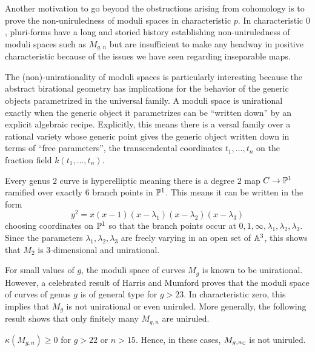\documentclass[main.tex]{subfiles}
\begin{document}
Another motivation to go beyond the obstructions arising from \etale cohomology is to prove the non-uniruledness of moduli spaces in characteristic $p$. In characteristic $0$, pluri-forms have a long and storied history establishing non-uniruledness of moduli spaces such as $M_{g,n}$ but are insufficient to make any headway in positive characteristic because of the issues we have seen regarding inseparable maps.
\par 
The (non)-unirationality of moduli spaces is particularly interesting because the abstract birational geometry has implications for the behavior of the generic objects parametrized in the universal family. A moduli space is unirational exactly when the generic object it parametrizes can be ``written down'' by an explicit algebraic recipe. Explicitly, this means there is a versal family over a rational variety whose generic point gives the generic object written down in terms of ``free parameters'', the transcendental coordinates $t_1, \dots, t_n$ on the fraction field $k(t_1, \dots, t_n)$.

\begin{example}
Every genus $2$ curve is hyperelliptic meaning there is a degree $2$ map $C \to \P^1$ ramified over exactly $6$ branch points in $\P^1$. This means it can be written in the form 
\[ y^2 = x(x-1)(x-\lambda_1)(x-\lambda_2)(x-\lambda_3) \] 
choosing coordinates on $\P^1$ so that the branch points occur at $0,1,\infty,\lambda_1,\lambda_2,\lambda_3$. Since the parameters $\lambda_1, \lambda_2, \lambda_3$ are freely varying in an open set of $\A^3$, this shows that $M_2$ is $3$-dimensional and unirational. 
\end{example}

For small values of $g$, the moduli space of curves $M_g$ is known to be unirational. However, a celebrated result of Harris and Mumford proves that the moduli space of curves of genus $g$ is of general type for $g > 23$. In characteristic zero, this implies that $M_{g}$ is not unirational or even uniruled. More generally, the following result shows that only finitely many $M_{g,n}$ are uniruled.  

\begin{theorem} \cite{harris-mumford:kodaira_dimension_Mg_I, harris-mumford:kodaira_dimension_Mg_II, logan:kodaira_dimension_marked_points, farkas-jensen-payne:nonabelian_BN_divisor, farkas-jensen-payne:kodaria_dimension_M22_M23,   Ruben:kodaira_2025}
$\kappa(M_{g,n}) \ge 0$ for $g > 22$ or $n > 15$. Hence, in these cases, $M_{g,n_{\CC}}$ is not uniruled. 
\end{theorem}
\end{document}
